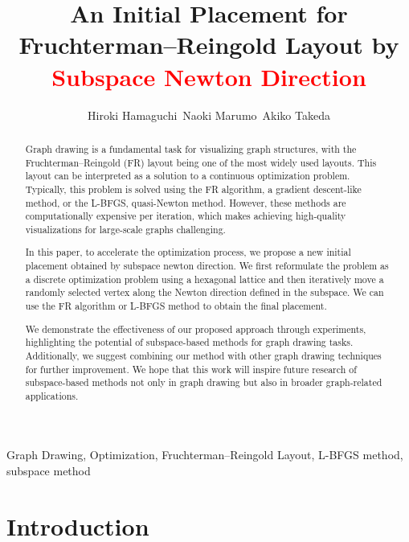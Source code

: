 \documentclass[dvipdfmx,journal]{IEEEtran}
\newcommand{\red}[1]{\textcolor{red}{#1}}
\begin{document}

\title{
    An Initial Placement
    for Fruchterman--Reingold Layout
    by \red{Subspace Newton Direction}
}
\author{
    Hiroki Hamaguchi\,
    Naoki Marumo\,
    Akiko Takeda
}
\maketitle

\begin{abstract}
    Graph drawing is a fundamental task for visualizing graph structures, with the Fruchterman--Reingold (FR) layout being one of the most widely used layouts.
    This layout can be interpreted as a solution to a continuous optimization problem.
    Typically, this problem is solved using the FR algorithm, a gradient descent-like method, or the L-BFGS, quasi-Newton method.
    However, these methods are computationally expensive per iteration, which makes achieving high-quality visualizations for large-scale graphs challenging.

    In this paper, to accelerate the optimization process, we propose a new initial placement obtained by subspace newton direction.
    We first reformulate the problem as a discrete optimization problem using a hexagonal lattice
    and then iteratively move a randomly selected vertex along the Newton direction defined in the subspace.
    We can use the FR algorithm or L-BFGS method to obtain the final placement.

    We demonstrate the effectiveness of our proposed approach through experiments, highlighting the potential of subspace-based methods for graph drawing tasks.
    Additionally, we suggest combining our method with other graph drawing techniques for further improvement.
    We hope that this work will inspire future research of subspace-based methods not only in graph drawing but also in broader graph-related applications.
\end{abstract}

\begin{IEEEkeywords}
    Graph Drawing,
    Optimization,
    Fruchterman--Reingold Layout,
    L-BFGS method,
    subspace method
\end{IEEEkeywords}

\section{Introduction}\label{sec:introduction}
\end{document}
